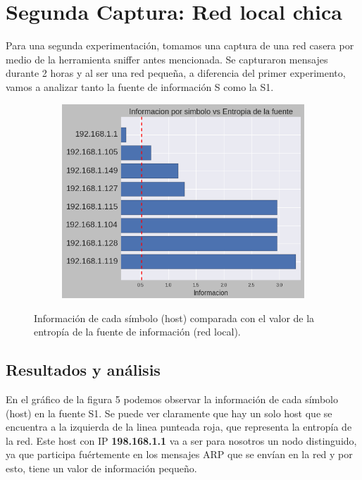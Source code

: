 \section{Segunda Captura: Red local chica}

\par Para una segunda experimentación, tomamos una captura de una red casera por medio de la herramienta sniffer antes mencionada. Se capturaron mensajes durante 2 horas y al ser una red pequeña, a diferencia del primer experimento, vamos a analizar tanto la fuente de información S como la S1.

\begin{figure}[h]
  \begin{subfigure}{.5\textwidth}
    \includegraphics[width=\textwidth]{imagenes/hogarenia/hosts_informaciones_vs_entropia.png}
  \end{subfigure}
  \label{fig:exp2_hogar_hosts_infovsentro}
  \caption{Información de cada símbolo (host) comparada con el valor de la entropía de la fuente de información (red local).}
\end{figure}

\subsection{Resultados y análisis}

\par En el gráfico de la figura 5 podemos observar la información de cada símbolo (host) en la fuente S1. Se puede ver claramente que hay un solo host que se encuentra a la izquierda de la linea punteada roja, que representa la entropía de la red. Este host con IP \textbf{198.168.1.1} va a ser para nosotros un nodo distinguido, ya que participa fuértemente en los mensajes ARP que se envían en la red y por esto, tiene un valor de información pequeño.

